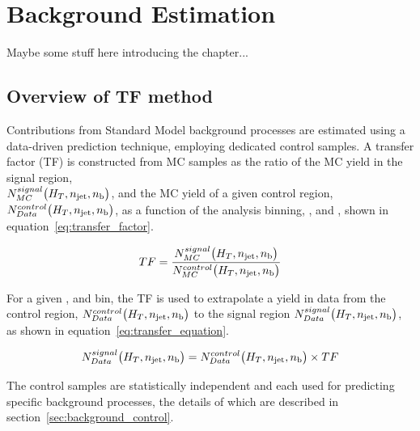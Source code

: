 \chapter{Background Estimation}
\label{ch:6}

\ifpdf
    \graphicspath{{Chapter6/Figs/Raster/}{Chapter6/Figs/PDF/}{Chapter6/Figs/}}
\else
    \graphicspath{{Chapter6/Figs/Vector/}{Chapter6/Figs/}}
\fi

Maybe some stuff here introducing the chapter...

\section{Overview of TF method}  %
\label{sec:background_overview}

Contributions from Standard Model background processes are estimated using a data-driven 
prediction technique, employing dedicated control samples. A transfer factor (TF) 
is constructed from MC samples as the ratio 
of the MC yield in the signal region, \\$N_{MC}^{signal}\big(H_T, n_{\text{jet}}, n_{\text{b}}\big)$,
and the MC yield of a given control region, \\$N_{Data}^{control}\big(H_T, n_{\text{jet}}, n_{\text{b}}\big)$,
as a function of the analysis binning, \HT, \nj and \nb, shown in
equation~\ref{eq:transfer_factor}.

\begin{equation}
TF = \frac{N_{MC}^{signal}\big(H_T, n_{\text{jet}}, n_{\text{b}}\big)}{N_{MC}^{control}\big(H_T, n_{\text{jet}}, n_{\text{b}}\big)}
\label{eq:transfer_factor}
\end{equation}

For a given \HT, \nj and \nb bin, the TF is used to extrapolate a yield in data from
the control region, $N_{Data}^{control}\big(H_T, n_{\text{jet}}, n_{\text{b}}\big)$
to the signal region $N_{Data}^{signal}\big(H_T, n_{\text{jet}}, n_{\text{b}}\big)$, as shown in
equation~\ref{eq:transfer_equation}.

\begin{equation}
N_{Data}^{signal}\big(H_T, n_{\text{jet}}, n_{\text{b}}\big) = N_{Data}^{control}\big(H_T, n_{\text{jet}}, n_{\text{b}}\big)
\times TF
\label{eq:transfer_equation}
\end{equation}

The control samples are statistically independent and each used for predicting 
specific background processes, the details of which are described in
section~\ref{sec:background_control}.

